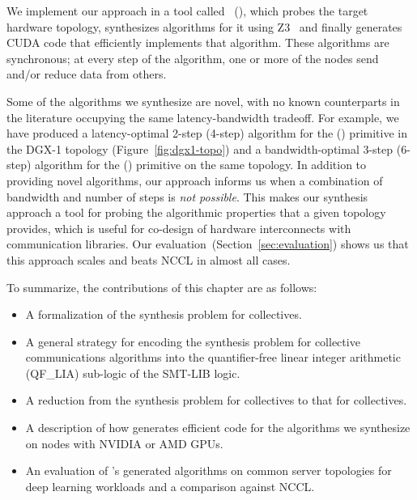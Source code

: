 We implement our approach in a tool called \toollong{}~(\tool{}),
which probes the target hardware topology, synthesizes algorithms for
it using Z3~\cite{z3} and finally generates CUDA code that efficiently implements that algorithm.  These algorithms are
synchronous; at every step of the algorithm, one or more of the nodes
send and/or reduce data from others.

Some of the algorithms we synthesize are novel, with no known counterparts in
the literature occupying the same latency-bandwidth tradeoff. For example, we
have produced a latency-optimal 2-step (4-step) algorithm for
the \allgather (\allreduce) primitive in the DGX-1 topology (Figure~\ref{fig:dgx1-topo}) and
a bandwidth-optimal 3-step (6-step) algorithm for the \allgather (\allreduce) primitive on the
same topology.  In addition to providing novel
algorithms, our approach informs us when a combination of bandwidth and number
of steps is \emph{not possible}. This makes our synthesis approach a tool for
probing the algorithmic properties that a given topology provides, which is
useful for co-design of hardware interconnects with communication libraries.
Our evaluation~(Section~\ref{sec:evaluation}) shows us that this approach scales and beats NCCL in almost all cases.


To summarize, the contributions of this chapter are as follows:
\begin{itemize}
    \item A formalization of the synthesis problem for \broadcasting collectives.
    \item A general strategy for encoding the synthesis problem for
    collective communications algorithms into the quantifier-free linear integer
    arithmetic (QF\_LIA) sub-logic of the SMT-LIB logic.
    \item A reduction from the synthesis problem for \reducing collectives to that for \broadcasting collectives.
    \item A description of how \tool{} generates efficient code for the algorithms we synthesize on nodes with NVIDIA or AMD GPUs.
    \item An evaluation of \tool's generated algorithms on common server topologies for deep learning workloads and a comparison against NCCL.
\end{itemize}


